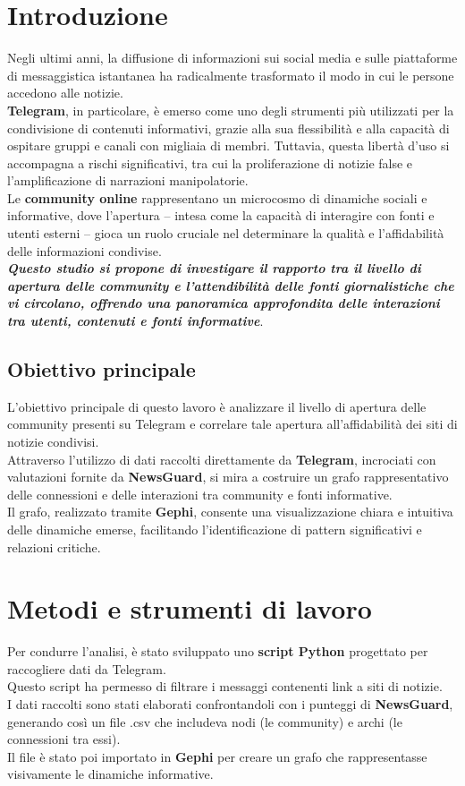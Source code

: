 \documentclass[12pt]{article}
\begin{document}
	\section{Introduzione}
	\pagestyle{plain}
	Negli ultimi anni, la diffusione di informazioni sui social media e sulle piattaforme di messaggistica istantanea ha radicalmente trasformato il modo in cui le persone accedono alle notizie.\\ 
	\textbf{Telegram}, in particolare, è emerso come uno degli strumenti più utilizzati per la condivisione di contenuti informativi, grazie alla sua flessibilità e alla capacità di ospitare gruppi e canali con migliaia di membri. Tuttavia, questa libertà d'uso si accompagna a rischi significativi, tra cui la proliferazione di notizie false e l'amplificazione di narrazioni manipolatorie.
	\\
	Le \textbf{community online} rappresentano un microcosmo di dinamiche sociali e informative, dove l'apertura – intesa come la capacità di interagire con fonti e utenti esterni – gioca un ruolo cruciale nel determinare la qualità e l'affidabilità delle informazioni condivise.\\ \textit{\textbf{Questo studio si propone di investigare il rapporto tra il livello di apertura delle community e l'attendibilità delle fonti giornalistiche che vi circolano, offrendo una panoramica approfondita delle interazioni tra utenti, contenuti e fonti informative}}.
	\subsection{Obiettivo principale}
	L'obiettivo principale di questo lavoro è analizzare il livello di apertura delle community presenti su Telegram e correlare tale apertura all'affidabilità dei siti di notizie condivisi.\\ Attraverso l'utilizzo di dati raccolti direttamente da \textbf{Telegram}, incrociati con valutazioni fornite da \textbf{NewsGuard}, si mira a costruire un grafo rappresentativo delle connessioni e delle interazioni tra community e fonti informative.\\
	Il grafo, realizzato tramite \textbf{Gephi}, consente una visualizzazione chiara e intuitiva delle dinamiche emerse, facilitando l'identificazione di pattern significativi e relazioni critiche.
	\newpage
	\section{Metodi e strumenti di lavoro}
	Per condurre l'analisi, è stato sviluppato uno \textbf{script Python} progettato per raccogliere dati da Telegram. 
	\\Questo script ha permesso di filtrare i messaggi contenenti link a siti di notizie. \\I dati raccolti sono stati elaborati confrontandoli con i punteggi di \textbf{NewsGuard}, generando così un file .csv che includeva nodi (le community) e archi (le connessioni tra essi). \\Il file è stato poi importato in \textbf{Gephi} per creare un grafo che rappresentasse visivamente le dinamiche informative.
\end{document}

